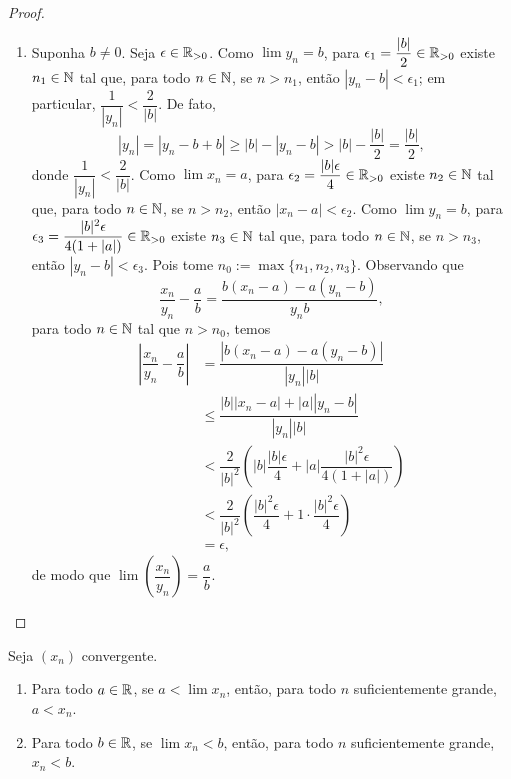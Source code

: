 \begin{proof}
\begin{enumerate}[leftmargin=*, align=left, label=\textbf{(\alph*)}]
\begin{align*}
                        &< \epsilon,
                \end{align*}
            de modo que $\lim \, (x_n \cdot y_n) = a \cdot b$. \blackproof
            \item Suponha $b \neq 0$. Seja $\epsilon \in \mathbb{R}_{>0}$. Como $\lim y_n = b$, para $\displaystyle \epsilon_1 = \dfrac{|b|}{2} \in \mathbb{R}_{>0}$ existe $n_1 \in \mathbb{N}$ tal que, para todo $n \in \mathbb{N}$, se $n > n_1$, então $|y_n - b| < \epsilon_1$; em particular, $\dfrac{1}{|y_n|} < \dfrac{2}{|b|}$. De fato,
                \[
                    |y_n| = |y_n - b + b| \geq |b| - |y_n - b| > |b| - \dfrac{|b|}{2} = \dfrac{|b|}{2},
                \]
            donde $\dfrac{1}{|y_n|} < \dfrac{2}{|b|}$. Como $\lim x_n = a$, para $\displaystyle \epsilon_2 = \dfrac{|b| \epsilon}{4} \in \mathbb{R}_{>0}$ existe $n_2 \in \mathbb{N}$ tal que, para todo $n \in \mathbb{N}$, se $n > n_2$, então $|x_n - a| < \epsilon_2$. Como $\lim y_n = b$, para $\displaystyle \epsilon_3 = \dfrac{|b|^2 \epsilon}{4(1 + |a|)} \in \mathbb{R}_{>0}$ existe $n_3 \in \mathbb{N}$ tal que, para todo $n \in \mathbb{N}$, se $n > n_3$, então $|y_n - b| < \epsilon_3$. Pois tome $n_0 := \max \{n_1, n_2, n_3 \}$. Observando que
                \[
                    \dfrac{x_n}{y_n} - \dfrac{a}{b} = \dfrac{b(x_n - a) - a(y_n - b)}{y_n b},
                \]
            para todo $n \in \mathbb{N}$ tal que $n > n_0$, temos
                \begin{align*}
                    \left| \dfrac{x_n}{y_n} - \dfrac{a}{b} \right|
                        &= \dfrac{|b(x_n - a) - a(y_n - b)|}{|y_n| |b|} \\
                        &\leq \dfrac{|b| |x_n - a| + |a| |y_n - b|}{|y_n| |b|} \\
                        &< \dfrac{2}{|b|^2} \left( |b| \dfrac{|b| \epsilon}{4} + |a| \dfrac{|b|^2 \epsilon}{4(1 + |a|)} \right) \\
                        &< \dfrac{2}{|b|^2} \left( \dfrac{|b|^2 \epsilon}{4} + 1 \cdot \dfrac{|b|^2 \epsilon}{4} \right) \\
                        &= \epsilon,
                \end{align*}
            de modo que $\lim \left( \dfrac{x_n}{y_n} \right) = \dfrac{a}{b}$. \blackproof
        \end{enumerate}
\end{proof}

\begin{proposition}
    Seja $(x_n)$ convergente.
        \begin{enumerate}[leftmargin=*, align=left, label=\textbf{(\alph*)}]
            \item Para todo $a \in \mathbb{R}$, se $a < \lim x_n$, então, para todo $n$ suficientemente grande, $a < x_n$.
            \item Para todo $b \in \mathbb{R}$, se $\lim x_n < b$, então, para todo $n$ suficientemente grande, $x_n < b$.
        \end{enumerate}
\end{proposition}

